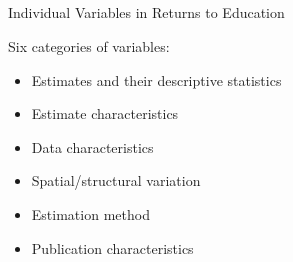 \documentclass{beamer} %
\begin{document}



\subsection{}

\begin{frame}{Individual Variables in Returns to Education}



    \begin{block}{Six categories of variables:}
        \begin{itemize}
            \item Estimates and their descriptive statistics
            \item Estimate characteristics
            \item Data characteristics
            \item Spatial/structural variation
            \item Estimation method
            \item Publication characteristics
        \end{itemize}
    \end{block}

\end{frame}
\end{document}
